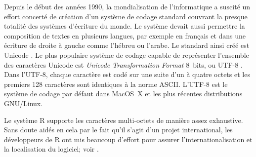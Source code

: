 \documentclass[letterpaper,11pt]{memoir}
\theoremstyle{plain}
\theoremstyle{definition}
\theoremstyle{remark}
\begin{document}
Depuis le début des années 1990, la mondialisation de l'informatique a
suscité un effort concerté de création d'un système de codage standard
couvrant la presque totalité des systèmes d'écriture du monde. Le
système devait aussi permettre la composition de textes en plusieurs
langues, par exemple en français et dans une écriture de droite à
gauche comme l'hébreu ou l'arabe. Le standard ainsi créé est Unicode
\citep{Unicode:5.0}. Le plus populaire système de codage capable de
représenter l'ensemble des caractères Unicode est \emph{Unicode
  Transformation Format} 8~bits, ou UTF-8 \citep[section
3.9]{Unicode:5.0}. Dans l'UTF-8, chaque caractère est codé sur une
suite d'un à quatre octets et les premiers 128 caractères sont
identiques à la norme ASCII. L'UTF-8 est le système de codage par
défaut dans MacOS~X et les plus récentes distributions GNU/Linux.

Le système R supporte les caractères multi-octets de manière assez
exhaustive. Sans doute aidés en cela par le fait qu'il s'agit d'un
projet international, les développeurs de R ont mis beaucoup d'effort
pour assurer l'internationalisation et la localisation du logiciel;
voir \cite{Ripley:Rnews:2005a}.

\end{document}

